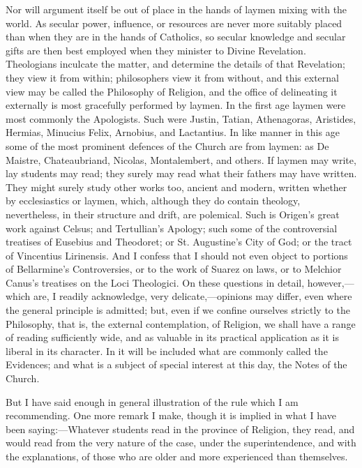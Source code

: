 Nor will argument itself be out of place in the hands of laymen
mixing with the world. As secular power, influence, or resources are
never more suitably placed than when they are in the hands of
Catholics, so secular knowledge and secular gifts are then best
employed when they minister to Divine Revelation. Theologians
inculcate the matter, and determine the details of that Revelation;
they view it from within; philosophers view it from without, and this
external view may be called the Philosophy of Religion, and the office
of delineating it externally is most gracefully performed by laymen.
In the first age laymen were most commonly the Apologists. Such were
Justin, Tatian, Athenagoras, Aristides, Hermias, Minucius Felix,
Arnobius, and Lactantius. In like manner in this age some of the most
prominent defences of the Church are from laymen: as De Maistre,
Chateaubriand, Nicolas, Montalembert, and others. If laymen may write,
lay students may read; they surely may read what their fathers may
have written. They might surely study other works too, ancient
and modern, written whether by ecclesiastics or laymen, which,
although they do contain theology, nevertheless, in their structure
and drift, are polemical. Such is Origen's great work against Celsus;
and Tertullian's Apology; such some of the controversial treatises of
Eusebius and Theodoret; or St. Augustine's City of God; or the tract
of Vincentius Lirinensis. And I confess that I should not even object
to portions of Bellarmine's Controversies, or to the work of Suarez on
laws, or to Melchior Canus's treatises on the Loci Theologici. On
these questions in detail, however,—which are, I readily
acknowledge, very delicate,—opinions may differ, even where the
general principle is admitted; but, even if we confine ourselves
strictly to the Philosophy, that is, the external contemplation, of
Religion, we shall have a range of reading sufficiently wide, and as
valuable in its practical application as it is liberal in its
character. In it will be included what are commonly called the
Evidences; and what is a subject of special interest at this day, the
Notes of the Church.

But I have said enough in general illustration of the rule which I
am recommending. One more remark I make, though it is implied in what
I have been saying:—Whatever students read in the province of
Religion, they read, and would read from the very nature of the case,
under the superintendence, and with the explanations, of those who are
older and more experienced than themselves.

